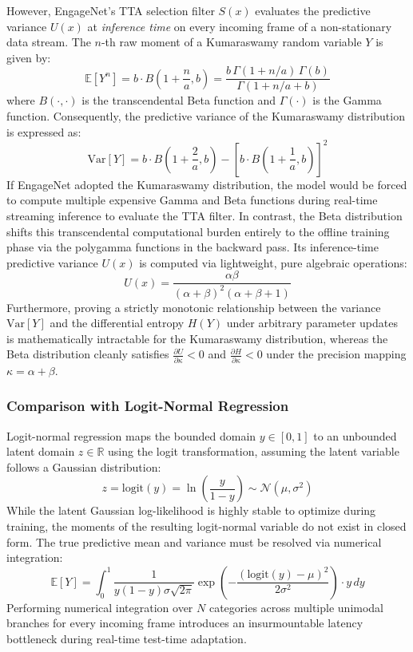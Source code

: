 \documentclass[11pt,a4paper]{article}
\newcommand{\R}{\mathbb{R}}
\begin{document}
	However, EngageNet's TTA selection filter $S(x)$ evaluates the predictive variance $U(x)$ at \textit{inference time} on every incoming frame of a non-stationary data stream. The $n$-th raw moment of a Kumaraswamy random variable $Y$ is given by:
	$$\mathbb{E}[Y^n] = b \cdot B\left(1 + \frac{n}{a}, b\right) = \frac{b \, \Gamma(1 + n/a)\,\Gamma(b)}{\Gamma(1 + n/a + b)}$$
	where $B(\cdot,\cdot)$ is the transcendental Beta function and $\Gamma(\cdot)$ is the Gamma function. Consequently, the predictive variance of the Kumaraswamy distribution is expressed as:
	$$\text{Var}[Y] = b \cdot B\left(1 + \frac{2}{a}, b\right) - \left[ b \cdot B\left(1 + \frac{1}{a}, b\right) \right]^2$$
	If EngageNet adopted the Kumaraswamy distribution, the model would be forced to compute multiple expensive Gamma and Beta functions during real-time streaming inference to evaluate the TTA filter. In contrast, the Beta distribution shifts this transcendental computational burden entirely to the offline training phase via the polygamma functions in the backward pass. Its inference-time predictive variance $U(x)$ is computed via lightweight, pure algebraic operations:
	$$U(x) = \frac{\alpha \beta}{(\alpha + \beta)^2 (\alpha + \beta + 1)}$$
	Furthermore, proving a strictly monotonic relationship between the variance $\text{Var}[Y]$ and the differential entropy $H(Y)$ under arbitrary parameter updates is mathematically intractable for the Kumaraswamy distribution, whereas the Beta distribution cleanly satisfies $\frac{\partial U}{\partial \kappa} < 0$ and $\frac{\partial H}{\partial \kappa} < 0$ under the precision mapping $\kappa = \alpha + \beta$.
	
	\subsubsection*{Comparison with Logit-Normal Regression}
	Logit-normal regression maps the bounded domain $y \in [0,1]$ to an unbounded latent domain $z \in \R$ using the logit transformation, assuming the latent variable follows a Gaussian distribution:
	$$z = \text{logit}(y) = \ln\left(\frac{y}{1-y}\right) \sim \mathcal{N}(\mu, \sigma^2)$$
	While the latent Gaussian log-likelihood is highly stable to optimize during training, the moments of the resulting logit-normal variable do not exist in closed form. The true predictive mean and variance must be resolved via numerical integration:
	$$\mathbb{E}[Y] = \int_{0}^{1} \frac{1}{y(1-y)\sigma\sqrt{2\pi}} \exp\left( -\frac{(\text{logit}(y) - \mu)^2}{2\sigma^2} \right) \cdot y \, dy$$
	Performing numerical integration over $N$ categories across multiple unimodal branches for every incoming frame introduces an insurmountable latency bottleneck during real-time test-time adaptation. 
	
\end{document}
